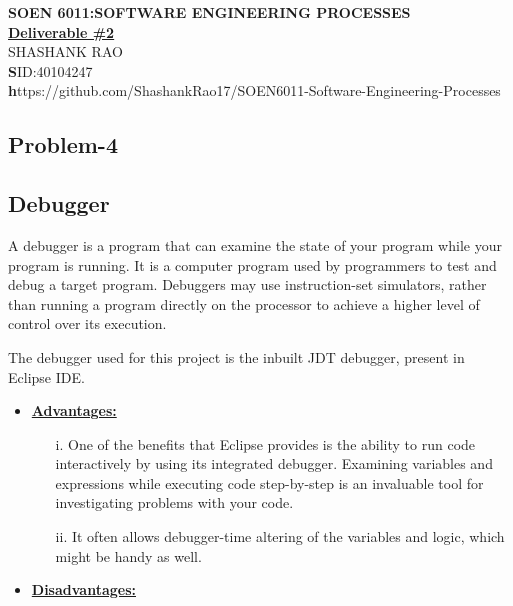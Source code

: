\documentclass[12pt]{report}
\begin{document}
\begin{center}
	\large\textbf{SOEN 6011:SOFTWARE ENGINEERING PROCESSES}\\
	\vspace{0.05cm}\large\textbf{\underline{Deliverable \#2}}\\
	\vspace{0.05cm}\small{SHASHANK RAO}\\
	\small\textbf SID:40104247\\

	\vspace{0.10cm}\small\textbf https://github.com/ShashankRao17/SOEN6011-Software-Engineering-Processes 
	
\end{center}

\renewcommand \thesection{\arabic{section}}
\renewcommand \thesubsection{\arabic{section}.\arabic{subsection}}

\begin{center}
\section{Problem-4}
\end{center}	

\subsection{Debugger}
A debugger is a program that can examine the state of your program while your program is running. 
It is a computer program used by programmers to test and debug a target program. Debuggers may use instruction-set simulators, rather than running a program directly on the processor to achieve a higher level of control over its execution.\par
The debugger used for this project is the inbuilt JDT debugger, present in Eclipse IDE.

\begin{itemize}
\item \textbf{\underline{Advantages:}}
	\begin{enumerate}
	\item[i.] One of the benefits that Eclipse provides is the ability to run code interactively by using its integrated debugger. Examining variables and expressions while executing code step-by-step is an invaluable tool for investigating problems with your code.
	\item[ii.] It often allows debugger-time altering of the variables and logic, which might be handy as well.
	\end{enumerate}
\item\textbf{\underline{Disadvantages:}}
\end{itemize}
\end{document}

